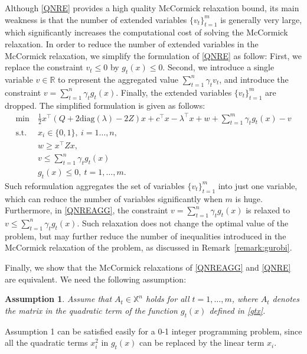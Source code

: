 \documentclass[pdflatex,sn-mathphys-num]{sn-jnl}%
\theoremstyle{thmstyleone}%
\theoremstyle{thmstyletwo}%
\theoremstyle{thmstylethree}%
\newtheorem{assumption}{Assumption}%
\begin{document}
Although \eqref{QNRE} provides a high quality McCormick relaxation bound, its main weakness is that the number of extended variables $\{v_t\}_{t=1}^m$ is generally very large, which significantly increases the computational cost of solving the McCormick relaxation. In order to reduce the number of extended variables in the McCormick relaxation, we simplify the formulation of \eqref{QNRE} as follow: First, we replace the constraint $v_t\leq 0$ by $g_t(x)\leq 0$. Second, we introduce a single variable $v\in\mathbb{R}$ to represent the aggregated value $\sum_{t=1}^n \gamma_t v_t$, and introduce the constraint $v=\sum_{t=1}^n \gamma_t g_t(x)$. Finally, the extended variables $\{v_t\}_{t=1}^m$ are dropped. The simplified formulation is given as follows:
\begin{equation}\label{QNREAGG}\tag{QNRE-AGG}
	\begin{aligned}
		\min ~&\frac{1}{2}x^\top(Q+2\textrm{diag}(\lambda)-2Z)x+c^\top x-\lambda^\top x+w+\sum_{t=1}^m \gamma_t g_t(x)-v\\
		\textrm{s.t.}~&x_i \in \{0,1\},~i=1\ldots,n,\\
		&w\geq x^\top Z x,\\
		&v\leq \sum_{t=1}^n \gamma_t g_t(x)\\
		&g_t(x)\leq 0,~t=1,\ldots,m.
	\end{aligned}
\end{equation}
Such reformulation aggregates the set of variables $\{v_t\}_{t=1}^m$ into just one variable, which can reduce the number of variables significantly when $m$ is huge. Furthermore, in \eqref{QNREAGG}, the constraint $v=\sum_{t=1}^n \gamma_t g_t(x)$ is relaxed to $v\leq \sum_{t=1}^n \gamma_t g_t(x)$. Such relaxation does not change the optimal value of the problem, but may further reduce the number of inequalities introduced in the McCormick relaxation of the problem, as discussed in Remark~\ref{remark:gurobi}.

Finally, we show that the McCormick relaxations of \eqref{QNREAGG} and \eqref{QNRE} are equivalent. We need the following assumption:

\begin{assumption}
Assume that $A_t\in\mathbb{X}^n$ holds for all $t=1,\ldots,m$, where $A_t$ denotes the matrix in the quadratic term of the function $g_t(x)$ defined in \eqref{gtx}.
\end{assumption}

Assumption 1 can be satisfied easily for a 0-1 integer programming problem, since all the quadratic terms $x_i^2$ in $g_t(x)$ can be replaced by the linear term $x_i$.
\end{document}
